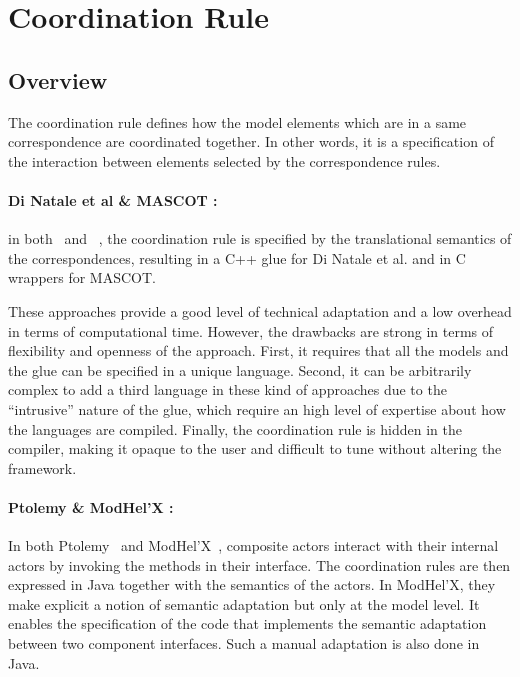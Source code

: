\section{Coordination Rule}
\subsection{Overview}
The coordination rule defines how the model elements which are in a same correspondence are coordinated together. In other words, it is a specification of the interaction between elements selected by the correspondence rules.

\paragraph{Di Natale et al \& MASCOT :}
in both~\cite{dinatale} and ~\cite{mascotbib}, the coordination rule is specified by the translational semantics of the correspondences, \ie resulting in a C++ glue for Di Natale et al. and in C wrappers for MASCOT. 

These approaches provide a good level of technical adaptation and a low overhead in terms of computational time. However, the drawbacks are strong in terms of flexibility and openness of the approach. First, it requires that all the models and the glue can be specified in a unique language. 
Second, it can be arbitrarily complex to add a third language in these kind of approaches due to the ``intrusive'' nature of the glue, which require an high level of expertise about how the languages are compiled. Finally, the coordination rule is hidden in the compiler, making it opaque to the user and difficult to tune without altering the framework.


\paragraph{Ptolemy \& ModHel'X :}			
In both Ptolemy~\cite{ptoleframebib} and ModHel'X~\cite{modhelxbib}, composite actors interact with their internal actors by invoking the methods in their interface. The coordination rules are then expressed in Java together with the semantics of the actors. In ModHel'X, they make explicit a notion of semantic adaptation but only at the model level. It enables the specification of the code that implements the semantic adaptation between two component interfaces. Such a manual adaptation is also done in Java.


